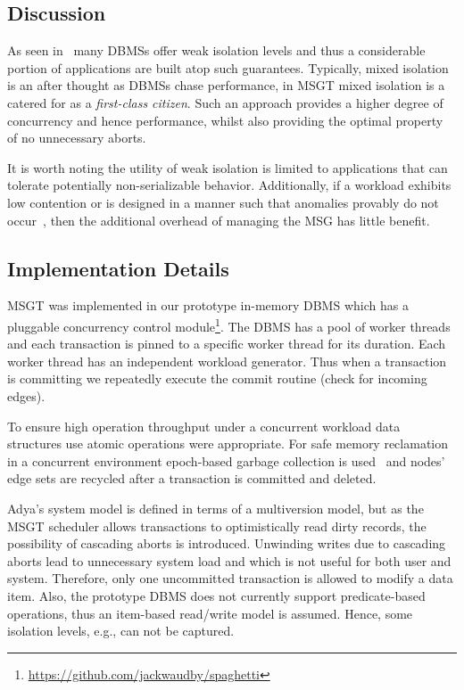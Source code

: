 \subsection{Discussion}
\label{sec:msgt-discussion}

As seen in~ many DBMSs offer weak isolation levels and 
thus a considerable portion of applications are built atop such guarantees.
Typically, mixed isolation is an after thought as DBMSs chase performance, in
MSGT mixed isolation is a catered for as a \emph{first-class citizen}. Such an approach
provides a higher degree of concurrency and hence performance, whilst also providing
the optimal property of no unnecessary aborts. 

It is worth noting the utility of weak isolation is limited to applications that can tolerate
potentially non-serializable behavior. Additionally, if a workload exhibits low contention or is designed in 
a manner such that anomalies provably do not occur~\cite{DBLP:journals/tods/FeketeLOOS05}, then the additional overhead of 
managing the MSG has little benefit.

\subsection{Implementation Details}
\label{sec:impl-deta}

MSGT was implemented in our prototype in-memory DBMS which has a pluggable
concurrency control module\footnote{\url{https://github.com/jackwaudby/spaghetti}}.
The DBMS has a pool of worker threads and each transaction is pinned to a specific
worker thread for its duration. Each worker thread has an independent workload
generator. Thus when a transaction is committing we repeatedly execute
the commit routine (check for incoming edges).

To ensure high operation throughput under a concurrent workload data
structures use atomic operations were appropriate. For safe memory reclamation in a concurrent environment
epoch-based garbage collection is used~\cite{DBLP:phd/ethos/Fraser04} and nodes' edge sets are recycled after a 
transaction is committed and deleted.

Adya's system model is defined in terms of a multiversion model, but as the MSGT
scheduler allows transactions to optimistically read dirty records, the possibility of
cascading aborts is introduced. Unwinding writes due to cascading aborts lead to
unnecessary system load and which is not useful for both user and system.
Therefore, only one uncommitted transaction is allowed to modify a data item.
Also, the prototype DBMS does not currently support predicate-based operations, thus
an item-based read/write model is assumed. Hence, some isolation levels, e.g.,
 can not be captured. 